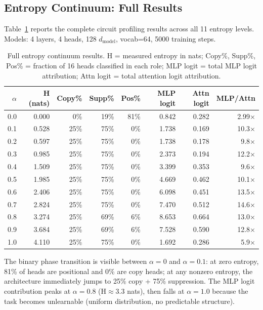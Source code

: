 \subsection{Entropy Continuum: Full Results}
\label{app:entropy_full}

Table~\ref{tab:entropy_full} reports the complete circuit profiling results across all 11
entropy levels. Models: 4 layers, 4 heads, 128 $d_{\text{model}}$, vocab=64, 5000 training steps.

\begin{table}[h]
\centering
\caption{Full entropy continuum results. H = measured entropy in nats; Copy\%, Supp\%,
Pos\% = fraction of 16 heads classified in each role; MLP logit = total MLP logit attribution;
Attn logit = total attention logit attribution.}
\label{tab:entropy_full}
\small
\begin{tabular}{rrrrrrrr}
\toprule
$\alpha$ & H (nats) & Copy\% & Supp\% & Pos\% & MLP logit & Attn logit & MLP/Attn \\
\midrule
0.0 & 0.000 &  0\% & 19\% & 81\% & 0.842 & 0.282 & 2.99$\times$ \\
0.1 & 0.528 & 25\% & 75\% &  0\% & 1.738 & 0.169 & 10.3$\times$ \\
0.2 & 0.597 & 25\% & 75\% &  0\% & 1.738 & 0.178 &  9.8$\times$ \\
0.3 & 0.985 & 25\% & 75\% &  0\% & 2.373 & 0.194 & 12.2$\times$ \\
0.4 & 1.509 & 25\% & 75\% &  0\% & 3.399 & 0.353 &  9.6$\times$ \\
0.5 & 1.985 & 25\% & 75\% &  0\% & 4.669 & 0.462 & 10.1$\times$ \\
0.6 & 2.406 & 25\% & 75\% &  0\% & 6.098 & 0.451 & 13.5$\times$ \\
0.7 & 2.824 & 25\% & 75\% &  0\% & 7.470 & 0.512 & 14.6$\times$ \\
0.8 & 3.274 & 25\% & 69\% &  6\% & 8.653 & 0.664 & 13.0$\times$ \\
0.9 & 3.684 & 25\% & 69\% &  6\% & 7.528 & 0.590 & 12.8$\times$ \\
1.0 & 4.110 & 25\% & 75\% &  0\% & 1.692 & 0.286 &  5.9$\times$ \\
\bottomrule
\end{tabular}
\end{table}

\noindent The binary phase transition is visible between $\alpha=0$ and $\alpha=0.1$: at zero
entropy, 81\% of heads are positional and 0\% are copy heads; at any nonzero entropy, the
architecture immediately jumps to 25\% copy + 75\% suppression. The MLP logit contribution
peaks at $\alpha=0.8$ (H$\approx$3.3 nats), then falls at $\alpha=1.0$ because the task becomes
unlearnable (uniform distribution, no predictable structure).

